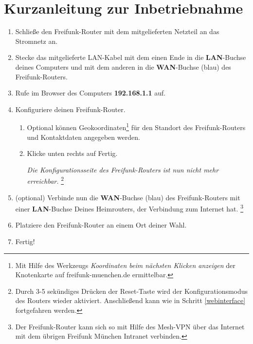 \documentclass{article}
\newcommand{\changefont}[3]{
\fontfamily{#1} \fontseries{#2} \fontshape{#3} \selectfont}
\begin{document}
\changefont{phv}{m}{n}

\section*{Kurzanleitung zur Inbetriebnahme}

\begin{enumerate}
\item Schließe den Freifunk-Router mit dem mitgelieferten Netzteil an das Stromnetz an.

\item Stecke das mitgelieferte LAN-Kabel mit dem einen Ende in die \textbf{LAN}-Buchse deines Computers und mit dem anderen in die \textbf{WAN}-Buchse (blau) des Freifunk-Routers.

\item Rufe im Browser des Computers \textbf{192.168.1.1} auf. \label{webinterface}

\item Konfiguriere deinen Freifunk-Router. 
\begin{enumerate}  
  \item Optional können Geokoordinaten\footnote{Mit Hilfe des Werkzeugs \textit{Koordinaten beim nächsten Klicken anzeigen} der Knotenkarte auf freifunk-muenchen.de ermittelbar.} für den Standort des Freifunk-Routers und Kontaktdaten angegeben werden.

  \item Klicke unten rechts auf \glqq{}Fertig\grqq{}. \label{fertig}

  \textit{Die Konfigurationsseite des Freifunk-Routers ist nun nicht mehr erreichbar.} \footnote{Durch 3-5 sekündiges Drücken der Reset-Taste wird der Konfigurationsmodus des Routers wieder aktiviert. Anschließend kann wie in Schritt \ref{webinterface} fortgefahren werden.}
\end{enumerate}

\item (optional) Verbinde nun die \textbf{WAN}-Buchse (blau) des Freifunk-Routers mit einer \textbf{LAN}-Buchse Deines Heimrouters, der Verbindung zum Internet hat. \footnote{Der Freifunk-Router kann sich so mit Hilfe des Mesh-VPN über das Internet mit dem übrigen Freifunk München Intranet verbinden.}

\item Platziere den Freifunk-Router an einem Ort deiner Wahl. \label{platzieren}

\item Fertig!
\end{enumerate}
\end{document}
